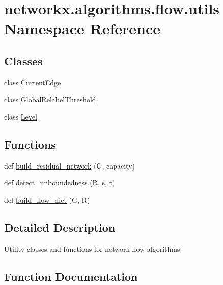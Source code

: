 \hypertarget{namespacenetworkx_1_1algorithms_1_1flow_1_1utils}{}\section{networkx.\+algorithms.\+flow.\+utils Namespace Reference}
\label{namespacenetworkx_1_1algorithms_1_1flow_1_1utils}
\subsection*{Classes}
\begin{DoxyCompactItemize}
\item 
class \hyperlink{classnetworkx_1_1algorithms_1_1flow_1_1utils_1_1CurrentEdge}{Current\+Edge}
\item 
class \hyperlink{classnetworkx_1_1algorithms_1_1flow_1_1utils_1_1GlobalRelabelThreshold}{Global\+Relabel\+Threshold}
\item 
class \hyperlink{classnetworkx_1_1algorithms_1_1flow_1_1utils_1_1Level}{Level}
\end{DoxyCompactItemize}
\subsection*{Functions}
\begin{DoxyCompactItemize}
\item 
def \hyperlink{namespacenetworkx_1_1algorithms_1_1flow_1_1utils_a515b34ec3e49e135f52a56a114eb6325}{build\+\_\+residual\+\_\+network} (G, capacity)
\item 
def \hyperlink{namespacenetworkx_1_1algorithms_1_1flow_1_1utils_a1bb8d6c8638ad8f624b26b1bcefc42ed}{detect\+\_\+unboundedness} (R, s, t)
\item 
def \hyperlink{namespacenetworkx_1_1algorithms_1_1flow_1_1utils_ab44f082cd2b370ad109055d451a69043}{build\+\_\+flow\+\_\+dict} (G, R)
\end{DoxyCompactItemize}


\subsection{Detailed Description}
\begin{DoxyVerb}Utility classes and functions for network flow algorithms.
\end{DoxyVerb}
 

\subsection{Function Documentation}
\mbox{\label{namespacenetworkx_1_1algorithms_1_1flow_1_1utils_ab44f082cd2b370ad109055d451a69043}} 
